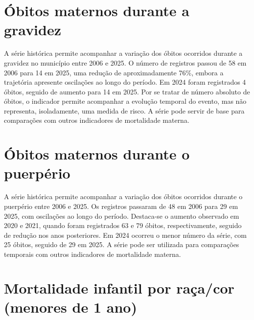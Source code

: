 \section{Óbitos maternos durante a gravidez}


A série histórica permite acompanhar a variação dos óbitos ocorridos durante a gravidez no município entre 2006 e 2025. O número de registros passou de 58 em 2006 para 14 em 2025, uma redução de aproximadamente 76\%, embora a trajetória apresente oscilações ao longo do período. Em 2024 foram registrados 4 óbitos, seguido de aumento para 14 em 2025. Por se tratar de número absoluto de óbitos, o indicador permite acompanhar a evolução temporal do evento, mas não representa, isoladamente, uma medida de risco. A série pode servir de base para comparações com outros indicadores de mortalidade materna.


\section{Óbitos maternos durante o puerpério}


A série histórica permite acompanhar a variação dos óbitos ocorridos durante o puerpério entre 2006 e 2025. Os registros passaram de 48 em 2006 para 29 em 2025, com oscilações ao longo do período. Destaca-se o aumento observado em 2020 e 2021, quando foram registrados 63 e 79 óbitos, respectivamente, seguido de redução nos anos posteriores. Em 2024 ocorreu o menor número da série, com 25 óbitos, seguido de 29 em 2025. A série pode ser utilizada para comparações temporais com outros indicadores de mortalidade materna.


\section{Mortalidade infantil por raça/\allowbreak{}cor (menores de 1 ano)}

